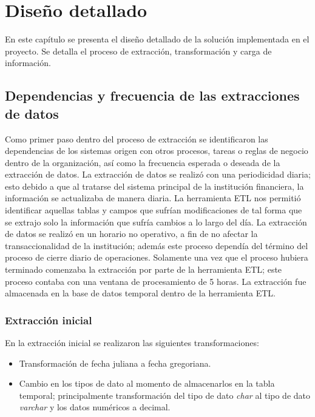\chapter{Diseño detallado}
\label{cap:diseno-detallado}

En este capítulo se presenta el diseño detallado de la solución implementada en el proyecto. 
Se detalla el proceso de extracción, transformación y carga de información.

\section{Dependencias y frecuencia de las extracciones de datos}

Como primer paso dentro del proceso de extracción se identificaron las
dependencias de los sistemas origen con otros procesos, tareas o reglas de
negocio dentro de la organización, así como la frecuencia esperada o deseada de
la extracción de datos. La extracción de datos se realizó con una periodicidad
diaria; esto debido a que al tratarse del sistema principal de la institución
financiera, la información se actualizaba de manera diaria. La herramienta ETL
nos permitió identificar aquellas tablas y campos que sufrían modificaciones de
tal forma que se extrajo solo la información que sufría cambios a lo largo del
día. La extracción de datos se realizó en un horario no operativo, a fin de no
afectar la transaccionalidad de la institución; además este proceso dependía del término
del proceso de cierre diario de operaciones. Solamente una vez que el proceso
hubiera terminado comenzaba la extracción por parte de la herramienta ETL; este
proceso contaba con una ventana de procesamiento de 5 horas. La extracción fue
almacenada en la base de datos temporal dentro de la herramienta ETL.

\subsection{Extracción inicial}

En la extracción inicial se realizaron las siguientes transformaciones:

\begin{itemize}
\item Transformación de fecha juliana a fecha gregoriana.
\item Cambio en los tipos de dato al momento de almacenarlos en la tabla
  temporal; principalmente transformación del tipo de dato \textit{char} al tipo
  de dato \textit{varchar} y los datos numéricos a decimal.
\end{itemize}

